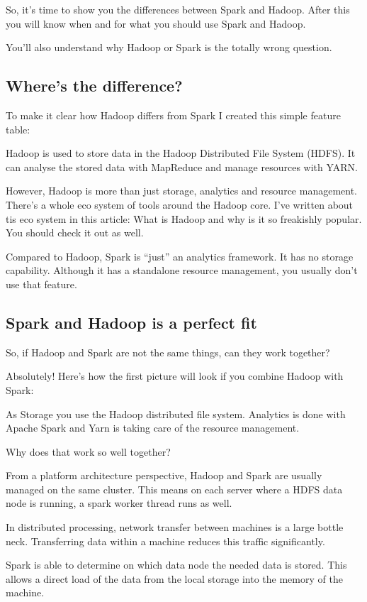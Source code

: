 \documentclass[12pt, numbers=noenddot]{scrreprt} %
\begin{document}
So, it's time to show you the differences between Spark and Hadoop. After this you will know when and for what you should use Spark and Hadoop.

You’ll also understand why Hadoop or Spark is the totally wrong question.

\subsection{Where's the difference?}
To make it clear how Hadoop differs from Spark I created this simple feature table:


Hadoop is used to store data in the Hadoop Distributed File System (HDFS). It can analyse the stored data with MapReduce and manage resources with YARN.

However, Hadoop is more than just storage, analytics and resource management. There’s a whole eco system of tools around the Hadoop core. I’ve written about tis eco system in this article: What is Hadoop and why is it so freakishly popular. You should check it out as well.

Compared to Hadoop, Spark is “just” an analytics framework. It has no storage capability. Although it has a standalone resource management, you usually don’t use that feature.

\subsection{Spark and Hadoop is a perfect fit}
So, if Hadoop and Spark are not the same things, can they work together?

Absolutely! Here’s how the first picture will look if you combine Hadoop with Spark:


As Storage you use the Hadoop distributed file system. Analytics is done with Apache Spark and Yarn is taking care of the resource management.

Why does that work so well together?

From a platform architecture perspective, Hadoop and Spark are usually managed on the same cluster. This means on each server where a HDFS data node is running, a spark worker thread runs as well.

In distributed processing, network transfer between machines is a large bottle neck. Transferring data within a machine reduces this traffic significantly.

Spark is able to determine on which data node the needed data is stored. This allows a direct load of the data from the local storage into the memory of the machine.
\end{document}

